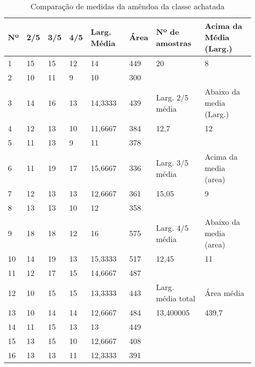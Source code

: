 \begin{anexosenv}
\begin{table}[hbtp!]
\centering
\caption{Comparação de medidas da amêndoa da classe achatada}
\label{tab:medidas_classe_achatada}
\begin{tabular}{|l|l|l|l|l|l|l|l|}
\hline
Nº & 2/5 & 3/5 & 4/5 & Larg. Média & Área & Nº de amostras & Acima da Média (Larg.) \\ \hline
1  & 15  & 15  & 12  & 14          & 449  & 20               & 8                      \\
2  & 10  & 11  & 9   & 10          & 300  &                  &                        \\\cline{7-8}
3  & 14  & 16  & 13  & 14,3333     & 439  & \multicolumn{1}{l|}{Larg. 2/5 média}   & \multicolumn{1}{l|}{Abaixo da media (Larg.)} \\\cline{7-8}
4  & 12  & 13  & 10  & 11,6667     & 384  & 12,7             & 12                     \\
5  & 11  & 13  & 9   & 11          & 378  &                  &                        \\\cline{7-8}
6  & 11  & 19  & 17  & 15,6667     & 336  & \multicolumn{1}{l|}{Larg. 3/5 média}   & \multicolumn{1}{l|}{Acima da media (area)}  \\\cline{7-8}
7  & 12  & 13  & 13  & 12,6667     & 361  & 15,05            & 9                      \\
8  & 13  & 13  & 10  & 12          & 358  &                  &                        \\\cline{7-8}
9  & 18  & 18  & 12  & 16          & 575  & \multicolumn{1}{l|}{Larg. 4/5 média}   & \multicolumn{1}{l|}{Abaixo da media (area)} \\\cline{7-8}
10 & 14  & 19  & 13  & 15,3333     & 517  & 12,45            & 11                     \\
11 & 12  & 17  & 15  & 14,6667     & 487  &                  &                        \\\cline{7-8}
12 & 10  & 15  & 15  & 13,3333     & 443  & Larg. média total & \multicolumn{1}{l|}{Área média}             \\\cline{7-8}
13 & 10  & 14  & 14  & 12,6667     & 484  & 13,400005        & 439,7                  \\
14 & 11  & 15  & 13  & 13          & 449  &                  &                        \\
15 & 13  & 15  & 10  & 12,6667     & 408  &                  &                        \\
16 & 13  & 13  & 11  & 12,3333     & 391  &                  &                        \\

\end{tabular}
\end{table}
\end{anexosenv}
